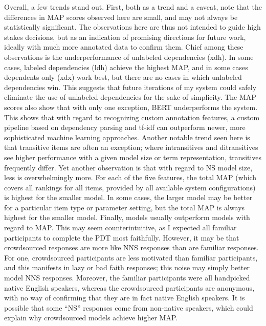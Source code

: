 Overall, a few trends stand out. First, both as a trend and a caveat, note that the differences in MAP scores observed here are small, and may not always be statistically significant.
The observations here are thus not intended to guide high stakes decisions, but as an indication of promising directions for future work, ideally with much more annotated data to confirm them.  Chief among these observations is the underperformance of unlabeled dependencies (xdh). In some cases, labeled dependencies (ldh) achieve the highest MAP, and in some cases dependents only (xdx) work best, but there are no cases in which unlabeled dependencies win. This suggests that future iterations of my system could safely eliminate the use of unlabeled dependencies for the sake of simplicity. The MAP scores also show that with only one exception, BERT underperforms the system. 
This shows that with regard to recognizing custom annotation features, a custom pipeline based on dependency parsing and tf-idf can outperform newer, more sophisticated machine learning approaches.  Another notable trend seen here is that transitive items are often an exception; where intransitives and ditransitives see higher performance with a given model size or term representation, transitives frequently differ. Yet another observation is that with regard to NS model size, less is overwhelmingly more. For each of the five features, the total MAP (which covers all rankings for all items, provided by all available system configurations) is highest for the smaller model. In some cases, the larger model may be better for a particular item type or parameter setting, but the total MAP is always highest for the smaller model. Finally,  models usually outperform  models with regard to MAP. This may seem counterintuitive, as I expected all familiar participants to complete the PDT most faithfully. However, it may be that crowdsourced responses are more like NNS responses than are familiar responses. For one, crowdsourced participants are less motivated than familiar participants, and this manifests in lazy or bad faith responses; this noise may simply better model NNS responses. Moreover, the familiar participants were all handpicked native English speakers, whereas the crowdsourced participants are anonymous, with no way of confirming that they are in fact native English speakers. It is possible that some ``NS'' responses come from non-native speakers, which could explain why crowdsourced models achieve higher MAP.

